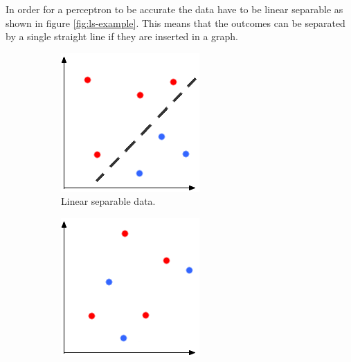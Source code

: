 In order for a perceptron to be accurate the data have to be linear separable as shown in figure \ref{fig:ls-example}. This means that the outcomes can be separated by a single straight line if they are inserted in a graph. 

\begin{centering}
\begin{figure}
  \begin{subfigure}[b]{0.4\textwidth}
    \includegraphics[width=\textwidth]{images/nn/separable.png}
    \caption{Linear separable data.}
  \end{subfigure}
  \hspace{12mm}
  \begin{subfigure}[b]{0.4\textwidth}
    \includegraphics[width=\textwidth]{images/nn/non-separable.png}

\end{subfigure}
\end{figure}
\end{centering}
